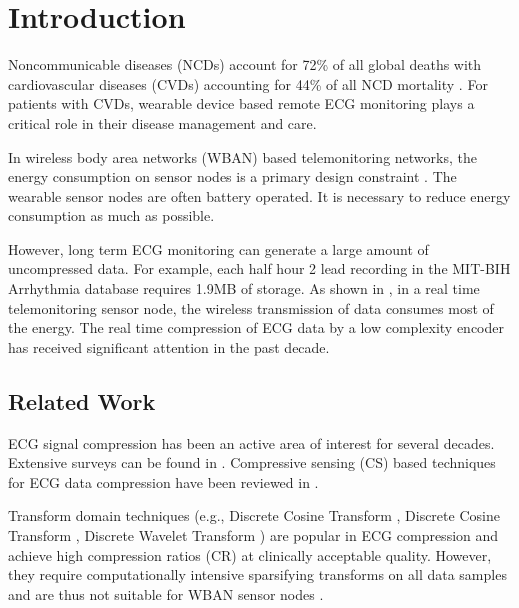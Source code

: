 \section{Introduction}
\label{sec:intro}
Noncommunicable diseases (NCDs) account for 72\%
of all global deaths with cardiovascular diseases
(CVDs) accounting for 44\% of all NCD mortality
\cite{collins2019interact}.
For patients with CVDs, wearable device based remote ECG
monitoring plays a critical role in their disease
management and care. 

In wireless body area networks (WBAN)
based telemonitoring networks\cite{cao2009enabling},
the energy consumption on sensor nodes is
a primary design constraint \cite{milenkovic2006wireless}.
The wearable sensor nodes are often battery operated.
It is necessary to reduce energy consumption as
much as possible.

However, long term ECG monitoring
can generate a large amount of uncompressed data.
For example, each half hour 2 lead recording in the
MIT-BIH Arrhythmia database \cite{moody2001impact}
requires 1.9MB of storage. As shown in \cite{mamaghanian2011compressed},
in a real time telemonitoring sensor node, the wireless
transmission of data consumes most of the energy.
The real time compression of ECG data by a low
complexity encoder has received significant attention
in the past decade.

\subsection{Related Work}

ECG signal compression has been an active area
of interest for several decades. Extensive surveys
can be found in \cite{singh2015review,rajankar2019electrocardiogram}.
Compressive sensing (CS) based techniques for ECG
data compression have been reviewed in \cite{craven2014compressed,kumar2022review}.

Transform domain techniques
(e.g., Discrete Cosine Transform \cite{al1995dynamic},
Discrete Cosine Transform \cite{batista2001compression,bendifallah2011improved},
Discrete Wavelet Transform \cite{djohan1995ecg,lu2000wavelet,pooyan2004wavelet,kim2006wavelet}) are popular in ECG compression
and achieve high compression ratios (CR) at clinically
acceptable quality.
However, they require computationally intensive sparsifying
transforms on all data samples and are thus not suitable
for WBAN sensor nodes \cite{craven2014compressed}.

